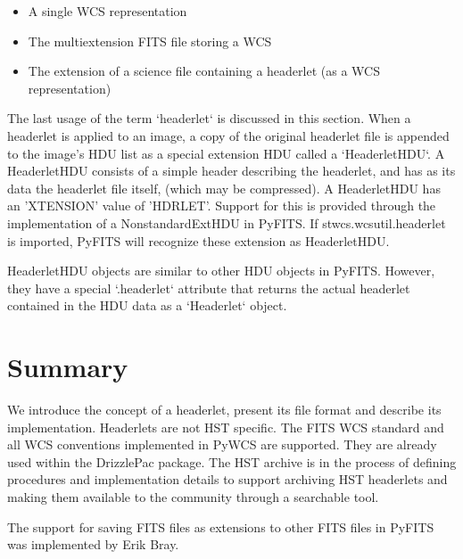 \begin{itemize}
\item A single WCS representation
\item The multiextension FITS file storing a WCS
\item The extension of a science file containing a headerlet (as a WCS representation)
\end{itemize}

The last usage of the term `headerlet` is discussed in this section. When a headerlet is applied to an image, a copy of the original headerlet file is appended to the image's HDU list as a special extension HDU called a `HeaderletHDU`. A HeaderletHDU consists of a simple header describing the headerlet, and has as its data the headerlet file itself, (which may be compressed). A HeaderletHDU has an 'XTENSION' value of 'HDRLET'. Support for this is provided through the implementation of a NonstandardExtHDU in PyFITS. If stwcs.wcsutil.headerlet is imported, PyFITS will recognize these extension as HeaderletHDU.

HeaderletHDU objects are similar to other HDU objects in PyFITS. However, they have a special `.headerlet` attribute that returns the actual headerlet contained in the HDU data as a `Headerlet` object.

\section{Summary}
We introduce the concept of a headerlet, present its file format and describe its implementation. Headerlets are not HST specific. The FITS WCS standard and all WCS conventions implemented in PyWCS are supported. They are already used within the DrizzlePac package. The HST archive is in the process of defining procedures and implementation details to support archiving HST headerlets and making them available to the community through a searchable tool.

\acknowledgements The support for saving FITS files as extensions to other FITS files in PyFITS was implemented by Erik Bray.


 
